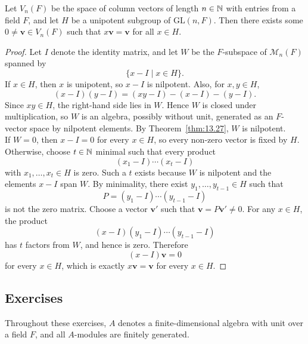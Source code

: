 \documentclass[../Odyssey_Project.tex]{subfiles}
\begin{document}
\begin{proposition}
\label{prop:13.28}
Let $V_n(F)$ be the space of column vectors of length $n \in \mathbb{N}$ with entries from a field $F$, and let $H$ be a unipotent subgroup of $\mathrm{GL}(n,F)$. Then there exists some $0 \neq \mathbf{v} \in V_n(F)$ such that $x\mathbf{v} = \mathbf{v}$ for all $x \in H$.
\end{proposition}
\begin{proof}
    Let $I$ denote the identity matrix, and let $W$ be the $F$-subspace of $\mathcal{M}_n(F)$ spanned by
    \[
        \{x-I \mid x \in H\}.
    \]
    If $x \in H$, then $x$ is unipotent, so $x-I$ is nilpotent. Also, for $x,y \in H$,
    \[
        (x-I)(y-I) = (xy-I) - (x-I) - (y-I).
    \]
    Since $xy \in H$, the right-hand side lies in $W$. Hence $W$ is closed under multiplication, so $W$ is an algebra, possibly without unit, generated as an $F$-vector space by nilpotent elements. By Theorem~\ref{thm:13.27}, $W$ is nilpotent.\\
    If $W=0$, then $x-I=0$ for every $x \in H$, so every non-zero vector is fixed by $H$. Otherwise, choose $t \in \mathbb{N}$ minimal such that every product
    \[
        (x_1-I)\cdots(x_t-I)
    \]
    with $x_1,\ldots,x_t \in H$ is zero. Such a $t$ exists because $W$ is nilpotent and the elements $x-I$ span $W$. By minimality, there exist $y_1,\ldots,y_{t-1} \in H$ such that
    \[
        P=(y_1-I)\cdots(y_{t-1}-I)
    \]
    is not the zero matrix. Choose a vector $\mathbf{v}'$ such that $\mathbf{v}=P\mathbf{v}' \neq 0$. For any $x \in H$, the product
    \[
        (x-I)(y_1-I)\cdots(y_{t-1}-I)
    \]
    has $t$ factors from $W$, and hence is zero. Therefore
    \[
        (x-I)\mathbf{v}=0
    \]
    for every $x \in H$, which is exactly $x\mathbf{v}=\mathbf{v}$ for every $x \in H$.
\end{proof}

\subsection*{Exercises}

Throughout these exercises, $A$ denotes a finite-dimensional algebra with unit over a field $F$, and all $A$-modules are finitely generated.
\end{document}
